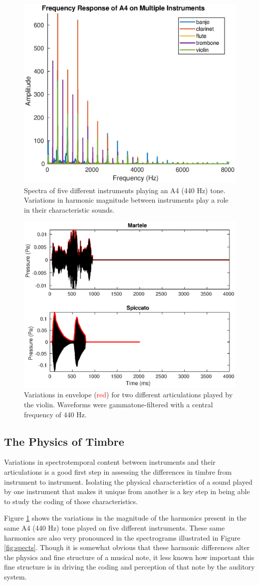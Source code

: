 \documentclass[conference]{IEEEtran}
\begin{document}
\begin{figure}
\includegraphics[width = .5\textwidth]{fft_all}
\caption{Spectra of five different instruments playing an A4 (440 Hz) tone. Variations in harmonic magnitude between instruments play a role in their characteristic sounds.}
\label{fig:fft_all}
\end{figure}

\begin{figure}[h!]
\includegraphics[width = .5\textwidth]{martele_spiccato_compare}
\caption{Variations in envelope (\textcolor{red}{red}) for two different articulations played by the violin. Waveforms were gammatone-filtered with a central frequency of 440 Hz.}
\label{fig:articulation}
\end{figure}

\subsection{The Physics of Timbre}
Variations in spectrotemporal content between instruments and their articulations is a good first step in assessing the differences in timbre from instrument to instrument. Isolating the physical characteristics of a sound played by one instrument that makes it unique from another is a key step in being able to study the coding of those characteristics. 

Figure \ref{fig:fft_all} shows the variations in the magnitude of the harmonics present in the same A4 (440 Hz) tone played on five different instruments. These same harmonics are also very pronounced in the spectrograms illustrated in Figure \ref{fig:spects}. Though it is somewhat obvious that these harmonic differences alter the physics and fine structure of a musical note, it less known how important this fine structure is in driving the coding and perception of that note by the auditory system.
\end{document}
